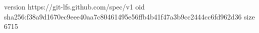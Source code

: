 version https://git-lfs.github.com/spec/v1
oid sha256:f38a9d1670ec9eee40aa7c80461495e56ffb4b41f47a3b9cc2444cc6fd962d36
size 6715

